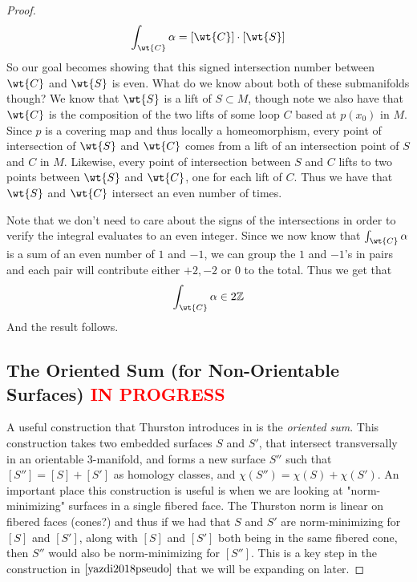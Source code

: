 \begin{proof}
    \begin{align*}
        \int_{\wt{C}} \alpha = [\wt{C}] \cdot [\wt{S}]
    \end{align*}
    So our goal becomes showing that this signed intersection number between $\wt{C}$ and $\wt{S}$ is even. What do we know about both of these submanifolds though? We know that $\wt{S}$ is a lift of $S \subset M$, though note we also have that $\wt{C}$ is the composition of the two lifts of some loop $C$ based at $p(x_0)$ in $M$. Since $p$ is a covering map and thus locally a homeomorphism, every point of intersection of $\wt{S}$ and $\wt{C}$ comes from a lift of an intersection point of $S$ and $C$ in $M$. Likewise, every point of intersection between $S$ and $C$ lifts to two points between $\wt{S}$ and $\wt{C}$, one for each lift of $C$. Thus we have that $\wt{S}$ and $\wt{C}$ intersect an even number of times. 
    
    Note that we don't need to care about the signs of the intersections in order to verify the integral evaluates to an even integer. Since we now know that $\int_{\wt{C}} \alpha$ is a sum of an even number of $1$ and $-1$, we can group the $1$ and $-1$'s in pairs and each pair will contribute either $+2,-2$ or $0$ to the total. Thus we get that
    \begin{align*}
        \int_{\wt{C}} \alpha \in 2\mathbb{Z}
    \end{align*}
    And the result follows.
    
\subsection{The Oriented Sum (for Non-Orientable Surfaces) \textcolor{red}{IN PROGRESS}}

A useful construction that Thurston introduces in \cite{thurston1986norm} is the \textit{oriented sum}. This construction takes two embedded surfaces $S$ and $S'$, that intersect transversally in an orientable 3-manifold, and forms a new surface $S''$ such that $[S''] = [S] + [S']$ as homology classes, and $\chi(S'') = \chi(S) + \chi(S')$. An important place this construction is useful is when we are looking at "norm-minimizing" surfaces in a single fibered face. The Thurston norm is linear on fibered faces (cones?) and thus if we had that $S$ and $S'$ are norm-minimizing for $[S]$ and $[S']$, along with $[S]$ and $[S']$ both being in the same fibered cone, then $S''$ would also be norm-minimizing for $[S'']$. This is a key step in the construction in $\cite{yazdi2018pseudo}$ that we will be expanding on later.


\end{proof}
